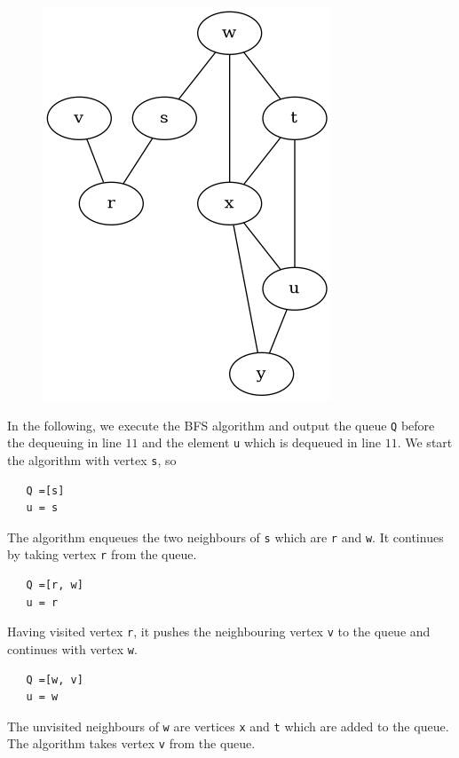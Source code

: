 \begin{figure}[H]
   \centering
   \includegraphics[scale=0.5]{images/graphs_bst_01.png}
\end{figure}

In the following, we execute the BFS algorithm and output the queue \verb|Q| before the dequeuing in line $11$ and the element \verb|u| which is dequeued in line $11$. We start the algorithm with vertex \verb|s|, so 

\begin{verbatim}
   Q =[s]
   u = s
\end{verbatim}

The algorithm enqueues the two neighbours of \verb|s|  which are \verb|r| and \verb|w|. It continues by taking vertex \verb|r| from the queue. 

\begin{verbatim}
   Q =[r, w]
   u = r
\end{verbatim}

Having visited vertex \verb|r|, it pushes the neighbouring vertex \verb|v| to the queue and continues with vertex \verb|w|.

\begin{verbatim}
   Q =[w, v]
   u = w
\end{verbatim}

The unvisited neighbours of \verb|w| are vertices \verb|x| and \verb|t| which are added to the queue. The algorithm takes vertex \verb|v| from the queue.

